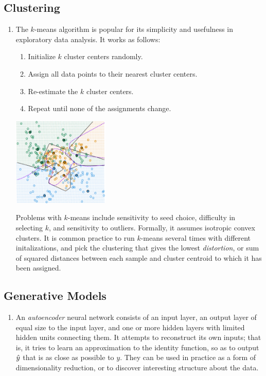 \documentclass[10pt]{article}
\begin{document}
\begin{multicols}{2}
\begin{addmargin}[0.8em]{0.5em}
    \subsection{Clustering}
    \begin{enumerate}[label=(\alph*)]
        \item The $k$-means algorithm is popular for its simplicity and usefulness in exploratory data analysis. It works as follows:
        \begin{enumerate}[1.]
            \item Initialize $k$ cluster centers randomly.
            \item Assign all data points to their nearest cluster centers.
            \item Re-estimate the $k$ cluster centers.
            \item Repeat until none of the assignments change.
        \end{enumerate}
        \begin{center}
            \includegraphics[width=4.6cm]{kmeans.png}
        \end{center}
        Problems with $k$-means include sensitivity to seed choice, difficulty in selecting $k$, and sensitivity to outliers. Formally, it assumes isotropic convex clusters. It is common practice to run $k$-means several times with different initalizations, and pick the clustering that gives the lowest \textit{distortion}, or sum of squared distances between each sample and cluster centroid to which it has been assigned.
    \end{enumerate}  
    
    \subsection{Generative Models}
    \begin{enumerate}[label=(\alph*)]
        \item An \textit{autoencoder} neural network consists of an input layer, an output layer of equal size to the input layer, and one or more hidden layers with limited hidden units connecting them. It attempts to reconstruct its own inputs; that is, it tries to learn an approximation to the identity function, so as to output $\Hat{y}$ that is as close as possible to $y$. They can be used in practice as a form of dimensionality reduction, or to discover interesting structure about the data.
    

\end{enumerate}
\end{addmargin}
\end{multicols}
\end{document}
